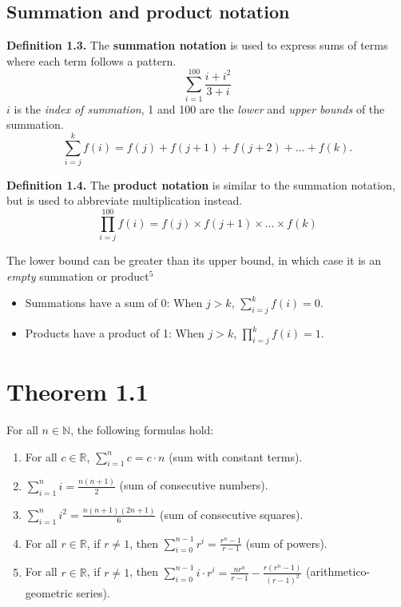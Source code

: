 \documentclass{article}
\begin{document}
\subsection{Summation and product notation}
\textbf{Definition 1.3.} The \textbf{summation notation} is used to express
sums of terms where each term follows a pattern.
$$ \sum_{i=1}^{100} \frac{i + i^2}{3 + i} $$
$i$ is the \emph{index of summation}, 1 and 100 are the \emph{lower} and 
\emph{upper bounds} of the summation.
\[
\sum_{i=j}^{k} f(i) = f(j) + f(j+1) + f(j+2) + \dots + f(k).
\]

\textbf{Definition 1.4.} The \textbf{product notation} is similar to the 
summation notation, but is used to abbreviate multiplication instead.
$$ \prod_{i=j}^{100} f(i) = f(j) \times f(j+1) \times \ldots \times f(k) $$

The lower bound can be greater than its upper bound, in which case it
is an \emph{empty} summation or product$^5$ 
\begin{itemize}
    \item Summations have a sum of 0: When \(j > k\), \(\sum_{i=j}^{k} f(i) = 0.\)
    \item Products have a product of 1: When \(j > k\), \(\prod_{i=j}^{k} f(i) = 1.\)
\end{itemize}


\section*{Theorem 1.1}

For all \(n \in \mathbb{N}\), the following formulas hold:

\begin{enumerate}
    \item For all \(c \in \mathbb{R}\), \(\sum_{i=1}^n c = c \cdot n\) (sum with constant terms).
    \item \(\sum_{i=1}^n i = \frac{n(n+1)}{2}\) (sum of consecutive numbers).
    \item \(\sum_{i=1}^n i^2 = \frac{n(n+1)(2n+1)}{6}\) (sum of consecutive squares).
    \item For all \(r \in \mathbb{R}\), if \(r \neq 1\), then \(\sum_{i=0}^{n-1} r^i = \frac{r^n-1}{r-1}\) (sum of powers).
    \item For all \(r \in \mathbb{R}\), if \(r \neq 1\), then \(\sum_{i=0}^{n-1} i \cdot r^i = \frac{nr^n}{r-1} - \frac{r(r^n-1)}{(r-1)^2}\) (arithmetico-geometric series).
\end{enumerate}
\end{document}

